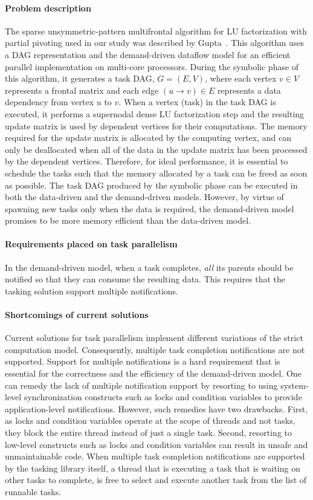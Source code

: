 \documentclass{sig-alternate}
\begin{document}
\paragraph{Problem description}
The sparse unsymmetric-pattern multifrontal algorithm for LU factorization with
partial pivoting used in our study was described by
Gupta~\cite{GUPTAsimax01,GUPTA00wsmp2}. This algorithm uses a DAG
representation and the demand-driven dataflow model for an efficient
parallel implementation on multi-core processors.  During the symbolic phase of
this algorithm, it generates a task DAG, $G =(E,V)$, where each vertex $v \in
V$ represents a frontal matrix and each edge $(u \rightarrow{} v) \in E$
represents a data dependency from vertex $u$ to $v$.  When a vertex  (task) in the task DAG is
executed, it performs a supernodal dense LU factorization step and the
resulting update matrix is used by dependent vertices for their computations.
The memory required for the update matrix is allocated by the computing vertex,
and can only be deallocated when all of the data in the update matrix has been
processed by the dependent vertices.  Therefore, for ideal performance, it is
essential to schedule the tasks such that the memory allocated by a task can be
freed as soon as possible. The task DAG produced by the symbolic phase can be
executed in both the data-driven and the demand-driven models. However, by
virtue of spawning new tasks only when the data is required, the demand-driven
model promises to be more memory efficient than the data-driven model.

\paragraph{Requirements placed on task parallelism}
In the demand-driven model, when a task completes, \textit{all} its parents
should be notified so that they can consume the resulting data.  This requires
that the tasking solution support multiple notifications. 

\paragraph{Shortcomings of current solutions}
Current solutions for task parallelism implement different variations of the
strict computation model. Consequently, multiple task completion
notifications are not supported.  Support for multiple notifications is a hard
requirement that is essential for the correctness and the efficiency of the
demand-driven model.  One can remedy the lack of multiple notification support
by resorting to using system-level synchronization constructs such as locks and
condition variables to provide application-level notifications.  However, such
remedies have two drawbacks. First, as locks and condition variables operate at
the scope of threads and not tasks, they block the entire thread instead of
just a single task. Second, resorting to low-level constructs such as locks and
condition variables can result in unsafe and unmaintainable code.  When
multiple task completion notifications are supported by the tasking library
itself, a thread that is executing a task that is waiting on other tasks to
complete, is free to select and execute another task from the list of runnable
tasks.
\end{document}

